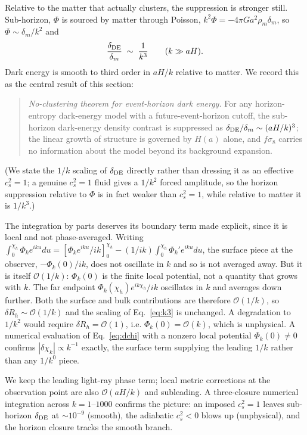 \documentclass[twocolumn,10pt]{article}
\begin{document}
Relative to the matter that actually clusters, the suppression is stronger
still. Sub-horizon, $\Phi$ is sourced by matter through Poisson,
$k^2\Phi=-4\pi G a^2\rho_m\delta_m$, so $\Phi\sim\delta_m/k^2$ and
\begin{equation}
\frac{\delta_{\rm DE}}{\delta_m}\;\sim\;\frac{1}{k^{3}}\qquad(k\gg aH).
\label{eq:k3}
\end{equation}
Dark energy is smooth to third order in $aH/k$ relative to matter. We record
this as the central result of this section:
\begin{quote}
\emph{No-clustering theorem for event-horizon dark energy.} For any
horizon-entropy dark-energy model with a future-event-horizon cutoff, the
sub-horizon dark-energy density contrast is suppressed as
$\delta_{\rm DE}/\delta_m\sim(aH/k)^3$; the linear growth of structure is
governed by $H(a)$ alone, and $f\sigma_8$ carries no information about the
model beyond its background expansion.
\end{quote}
(We state
the $1/k$ scaling of $\delta_{\rm DE}$ directly rather than dressing it as an
effective $c_s^2=1$; a genuine $c_s^2=1$ fluid gives a $1/k^2$ forced
amplitude, so the horizon suppression relative to $\Phi$ is in fact weaker than
$c_s^2=1$, while relative to matter it is $1/k^3$.)

The integration by parts deserves its boundary term made explicit, since it is
local and not phase-averaged. Writing
$\int_0^{\chi_h}\Phi_k e^{iku}du = [\Phi_k e^{iku}/ik]_0^{\chi_h}
- (1/ik)\int_0^{\chi_h}\Phi_k' e^{iku}du$, the surface piece at the observer,
$-\Phi_k(0)/ik$, does not oscillate in $k$ and so is not averaged away. But it
is itself $\mathcal{O}(1/k)$: $\Phi_k(0)$ is the finite local potential, not a
quantity that grows with $k$. The far endpoint $\Phi_k(\chi_h)e^{ik\chi_h}/ik$
oscillates in $k$ and averages down further. Both the surface and bulk
contributions are therefore $\mathcal{O}(1/k)$, so
$\delta R_h\sim\mathcal{O}(1/k)$ and the scaling of Eq.~\eqref{eq:k3} is
unchanged. A degradation to $1/k^2$ would require $\delta R_h=\mathcal{O}(1)$,
i.e. $\Phi_k(0)=\mathcal{O}(k)$, which is unphysical. A numerical evaluation of
Eq.~\eqref{eq:dchi} with a nonzero local potential $\Phi_k(0)\neq0$ confirms
$|\delta\chi_k|\propto k^{-1}$ exactly, the surface term supplying the leading
$1/k$ rather than any $1/k^0$ piece.

We keep the leading light-ray phase term; local metric corrections at the
observation point are also $\mathcal{O}(aH/k)$ and subleading. A three-closure
numerical integration across $k=1$--$1000$ confirms the picture: an imposed
$c_s^2=1$ leaves sub-horizon $\delta_{\rm DE}$ at $\sim10^{-9}$ (smooth), the
adiabatic $c_s^2<0$ blows up (unphysical), and the horizon closure tracks the
smooth branch.
\end{document}
